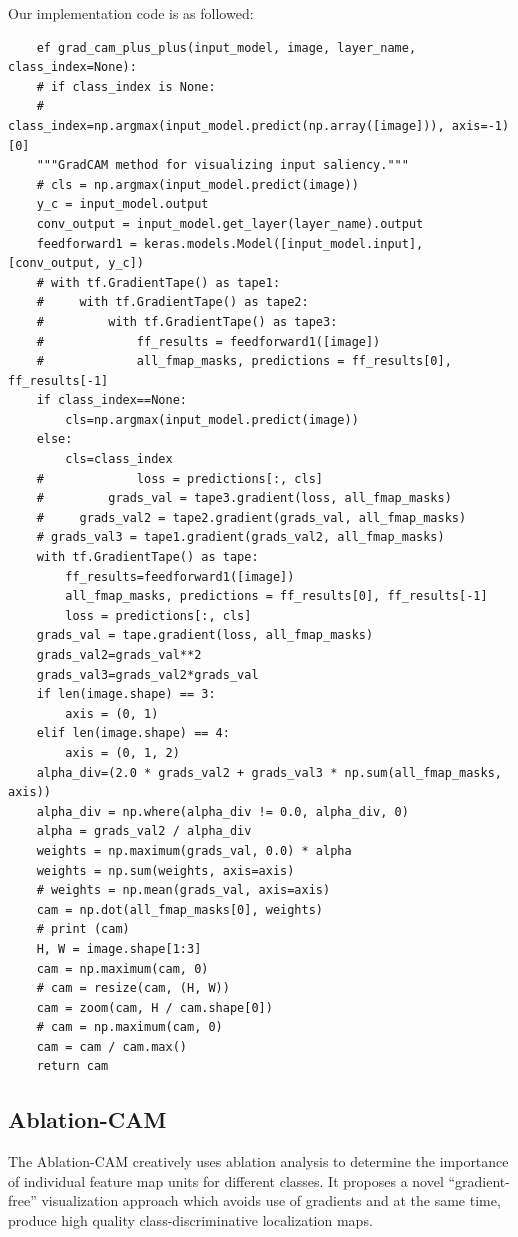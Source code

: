 \documentclass[conference]{IEEEtran}
\begin{document}
Our implementation code is as followed:
\begin{lstlisting}
    ef grad_cam_plus_plus(input_model, image, layer_name, class_index=None):
    # if class_index is None:
    #     class_index=np.argmax(input_model.predict(np.array([image])), axis=-1)[0]
    """GradCAM method for visualizing input saliency."""
    # cls = np.argmax(input_model.predict(image))
    y_c = input_model.output
    conv_output = input_model.get_layer(layer_name).output
    feedforward1 = keras.models.Model([input_model.input], [conv_output, y_c])
    # with tf.GradientTape() as tape1:
    #     with tf.GradientTape() as tape2:
    #         with tf.GradientTape() as tape3:
    #             ff_results = feedforward1([image])
    #             all_fmap_masks, predictions = ff_results[0], ff_results[-1]
    if class_index==None:
        cls=np.argmax(input_model.predict(image))
    else:
        cls=class_index
    #             loss = predictions[:, cls]
    #         grads_val = tape3.gradient(loss, all_fmap_masks)
    #     grads_val2 = tape2.gradient(grads_val, all_fmap_masks)
    # grads_val3 = tape1.gradient(grads_val2, all_fmap_masks)
    with tf.GradientTape() as tape:
        ff_results=feedforward1([image])
        all_fmap_masks, predictions = ff_results[0], ff_results[-1]
        loss = predictions[:, cls]
    grads_val = tape.gradient(loss, all_fmap_masks)
    grads_val2=grads_val**2
    grads_val3=grads_val2*grads_val
    if len(image.shape) == 3:
        axis = (0, 1)
    elif len(image.shape) == 4:
        axis = (0, 1, 2)
    alpha_div=(2.0 * grads_val2 + grads_val3 * np.sum(all_fmap_masks, axis))
    alpha_div = np.where(alpha_div != 0.0, alpha_div, 0)
    alpha = grads_val2 / alpha_div
    weights = np.maximum(grads_val, 0.0) * alpha
    weights = np.sum(weights, axis=axis)
    # weights = np.mean(grads_val, axis=axis)
    cam = np.dot(all_fmap_masks[0], weights)
    # print (cam)
    H, W = image.shape[1:3]
    cam = np.maximum(cam, 0)
    # cam = resize(cam, (H, W))
    cam = zoom(cam, H / cam.shape[0])
    # cam = np.maximum(cam, 0)
    cam = cam / cam.max()
    return cam
\end{lstlisting}
\subsection{Ablation-CAM}

The Ablation-CAM creatively uses ablation analysis to determine the importance of individual feature map units for different classes. It proposes a novel “gradient-free” visualization approach which avoids use of gradients and at the same time, produce high quality class-discriminative localization maps.\par
\end{document}
